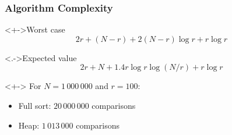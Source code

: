\documentclass[svgnames]{beamer}
\begin{document}
\begin{frame}
  \frametitle{Algorithm Complexity}
  
  \begin{block}<+->{Worst case}
    \begin{displaymath}
      2r + (N - r) + 2(N - r)\log r + r\log r
    \end{displaymath}
  \end{block}

  \begin{block}<.->{Expected value}
    \begin{displaymath}
      2r + N + 1.4r \log r\log(N/r) + r\log r
    \end{displaymath}
  \end{block}

  \begin{example}<+->
    For $N = 1\,000\,000$ and $r = 100$:
    \begin{itemize}
    \item Full sort: $20\,000\,000$ comparisons
    \item Heap: $1\,013\,000$ comparisons
    \end{itemize}
  \end{example}
\end{frame}


\end{document}
